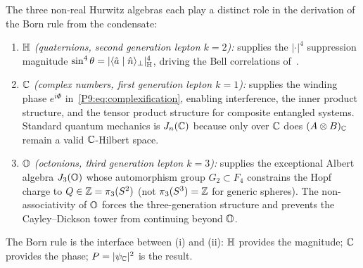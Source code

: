 \begin{remark}
\label{P9:rem:hurwitz_roles}
The three non-real Hurwitz algebras each play a distinct role in the
derivation of the Born rule from the condensate:
\begin{enumerate}[label=(\roman*)]
  \item $\mathbb{H}$ \emph{(quaternions, second generation lepton $k=2$):}
    supplies the $|\cdot|^4$ suppression magnitude
    $\sin^4\theta = |\langle\hat{a}\mid\hat{n}\rangle_\perp|_{\mathbb{H}}^4$,
    driving the Bell correlations of~\cite{Paper8}.

  \item $\mathbb{C}$ \emph{(complex numbers, first generation lepton $k=1$):}
    supplies the winding phase $e^{i\Phi}$ in~\eqref{P9:eq:complexification},
    enabling interference, the inner product structure, and the tensor
    product structure for composite entangled systems.
    Standard quantum mechanics is $J_n(\mathbb{C})$ because only over $\mathbb{C}$
    does $(A\otimes B)_{\mathbb{C}}$ remain a valid $\mathbb{C}$-Hilbert space.

  \item $\mathbb{O}$ \emph{(octonions, third generation lepton $k=3$):}
    supplies the exceptional Albert algebra $J_3(\mathbb{O})$ whose automorphism
    group $G_2\subset F_4$ constrains the Hopf charge to
    $Q\in\mathbb{Z} = \pi_3(S^2)$ (not $\pi_3(S^3)=\mathbb{Z}$ for generic spheres).
    The non-associativity of $\mathbb{O}$ forces the three-generation structure
    and prevents the Cayley--Dickson tower from continuing beyond $\mathbb{O}$.
\end{enumerate}
The Born rule is the interface between (i) and (ii): $\mathbb{H}$ provides the
magnitude; $\mathbb{C}$ provides the phase; $P=|\psi_{\mathbb{C}}|^2$ is the result.
\end{remark}

